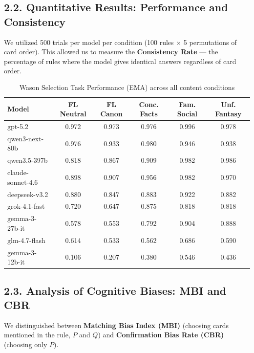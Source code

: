 \subsection*{2.2. Quantitative Results: Performance and Consistency}
We utilized 500 trials per model per condition (100 rules $\times$ 5 permutations of card order). This allowed us to measure the \textbf{Consistency Rate} --- the percentage of rules where the model gives identical answers regardless of card order.

\begin{table}[h!]
\centering
\caption{Wason Selection Task Performance (EMA) across all content conditions}
\label{tab:wason_full_data}
\begin{tabular}{lccccc}
\toprule
\textbf{Model} & \textbf{FL Neutral} & \textbf{FL Canon} & \textbf{Conc. Facts} & \textbf{Fam. Social} & \textbf{Unf. Fantasy} \\ 
\midrule
gpt-5.2           & 0.972 & 0.973 & 0.976 & 0.996 & 0.978 \\
qwen3-next-80b    & 0.976 & 0.933 & 0.980 & 0.946 & 0.938 \\
qwen3.5-397b      & 0.818 & 0.867 & 0.909 & 0.982 & 0.986 \\
claude-sonnet-4.6 & 0.898 & 0.907 & 0.956 & 0.982 & 0.970 \\
deepseek-v3.2     & 0.880 & 0.847 & 0.883 & 0.922 & 0.882 \\
grok-4.1-fast     & 0.720 & 0.647 & 0.875 & 0.818 & 0.818 \\
gemma-3-27b-it    & 0.578 & 0.553 & 0.792 & 0.904 & 0.888 \\
glm-4.7-flash     & 0.614 & 0.533 & 0.562 & 0.686 & 0.590 \\
gemma-3-12b-it    & 0.106 & 0.207 & 0.380 & 0.546 & 0.436 \\
\bottomrule
\end{tabular}
\end{table}

\subsection*{2.3. Analysis of Cognitive Biases: MBI and CBR}
We distinguished between \textbf{Matching Bias Index (MBI)} (choosing cards mentioned in the rule, $P$ and $Q$) and \textbf{Confirmation Bias Rate (CBR)} (choosing only $P$).

